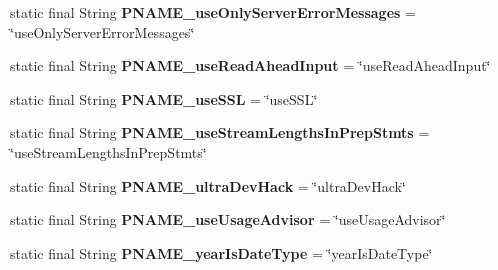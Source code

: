 \begin{DoxyCompactItemize}
static final String {\bfseries P\+N\+A\+M\+E\+\_\+use\+Only\+Server\+Error\+Messages} = \char`\"{}use\+Only\+Server\+Error\+Messages\char`\"{}
\item 
\mbox{\label{classcom_1_1mysql_1_1cj_1_1conf_1_1_property_definitions_a3dfb3bbe3e3dfdeeea020c208ca1d435}} 
static final String {\bfseries P\+N\+A\+M\+E\+\_\+use\+Read\+Ahead\+Input} = \char`\"{}use\+Read\+Ahead\+Input\char`\"{}
\item 
\mbox{\label{classcom_1_1mysql_1_1cj_1_1conf_1_1_property_definitions_a848763119938ab0f1f784bc418326ddb}} 
static final String {\bfseries P\+N\+A\+M\+E\+\_\+use\+S\+SL} = \char`\"{}use\+S\+SL\char`\"{}
\item 
\mbox{\label{classcom_1_1mysql_1_1cj_1_1conf_1_1_property_definitions_a78c3db89bfbd0147b66396880c618853}} 
static final String {\bfseries P\+N\+A\+M\+E\+\_\+use\+Stream\+Lengths\+In\+Prep\+Stmts} = \char`\"{}use\+Stream\+Lengths\+In\+Prep\+Stmts\char`\"{}
\item 
\mbox{\label{classcom_1_1mysql_1_1cj_1_1conf_1_1_property_definitions_a68febc0be2317249b93b0245af754987}} 
static final String {\bfseries P\+N\+A\+M\+E\+\_\+ultra\+Dev\+Hack} = \char`\"{}ultra\+Dev\+Hack\char`\"{}
\item 
\mbox{\label{classcom_1_1mysql_1_1cj_1_1conf_1_1_property_definitions_ac2e03a82b16638a5545727d4bf3e551b}} 
static final String {\bfseries P\+N\+A\+M\+E\+\_\+use\+Usage\+Advisor} = \char`\"{}use\+Usage\+Advisor\char`\"{}
\item 
\mbox{\label{classcom_1_1mysql_1_1cj_1_1conf_1_1_property_definitions_a246d58196bb2f56d2b487ef03334284b}} 
static final String {\bfseries P\+N\+A\+M\+E\+\_\+year\+Is\+Date\+Type} = \char`\"{}year\+Is\+Date\+Type\char`\"{}
\item 
\mbox{\label{classcom_1_1mysql_1_1cj_1_1conf_1_1_property_definitions_a29e848df762607444b9961d804ebfe04}} 

\end{DoxyCompactItemize}
